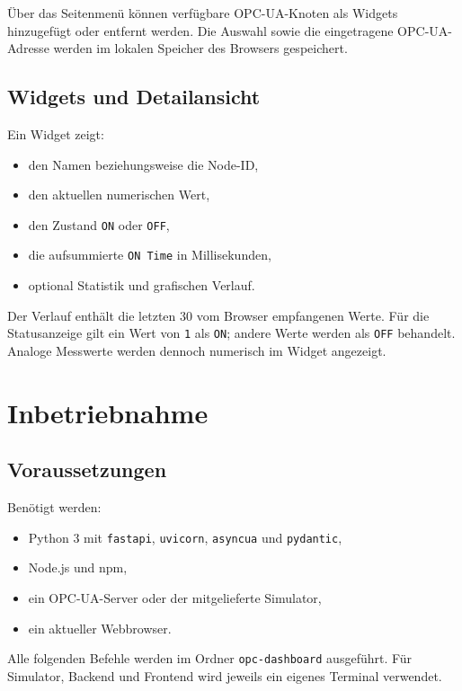 \documentclass[11pt,a4paper,parskip=half]{scrartcl}
\newcommand{\code}[1]{\texttt{#1}}
\begin{document}
Über das Seitenmenü können verfügbare OPC-UA-Knoten als Widgets hinzugefügt oder entfernt werden. Die Auswahl sowie die eingetragene OPC-UA-Adresse werden im lokalen Speicher des Browsers gespeichert.

\subsection{Widgets und Detailansicht}

Ein Widget zeigt:

\begin{itemize}
  \item den Namen beziehungsweise die Node-ID,
  \item den aktuellen numerischen Wert,
  \item den Zustand \code{ON} oder \code{OFF},
  \item die aufsummierte \code{ON Time} in Millisekunden,
  \item optional Statistik und grafischen Verlauf.
\end{itemize}

Der Verlauf enthält die letzten 30 vom Browser empfangenen Werte. Für die Statusanzeige gilt ein Wert von \code{1} als \code{ON}; andere Werte werden als \code{OFF} behandelt. Analoge Messwerte werden dennoch numerisch im Widget angezeigt.

\section{Inbetriebnahme}

\subsection{Voraussetzungen}

Benötigt werden:

\begin{itemize}
  \item Python 3 mit \code{fastapi}, \code{uvicorn}, \code{asyncua} und \code{pydantic},
  \item Node.js und npm,
  \item ein OPC-UA-Server oder der mitgelieferte Simulator,
  \item ein aktueller Webbrowser.
\end{itemize}

Alle folgenden Befehle werden im Ordner \code{opc-dashboard} ausgeführt. Für Simulator, Backend und Frontend wird jeweils ein eigenes Terminal verwendet.
\end{document}
